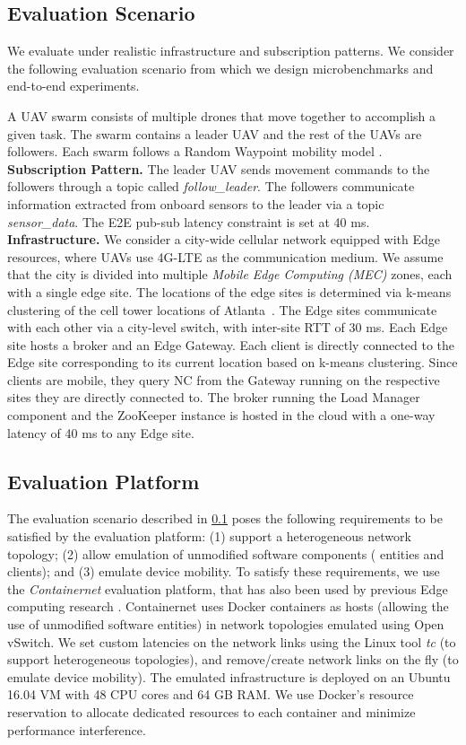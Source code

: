 \subsection{Evaluation Scenario}
\label{sec:epulsar_eval_scenario}
We evaluate \epulsar{} under realistic infrastructure and subscription patterns. We consider the following evaluation scenario from which we design microbenchmarks and end-to-end experiments.
\par A UAV swarm consists of multiple drones that move together to accomplish a given task. The swarm contains a leader UAV and the rest of the UAVs are followers. Each swarm follows a Random Waypoint mobility model \cite{rwp}.\\
\textbf{Subscription Pattern. } The leader UAV sends movement commands to the followers through a topic called \textit{follow\_leader}. The followers communicate information extracted from onboard sensors to the leader via a topic \textit{sensor\_data}. The E2E pub-sub latency constraint is set at 40 ms.\\
\textbf{Infrastructure. } We consider a city-wide cellular network equipped with Edge resources, where UAVs use 4G-LTE as the communication medium. We assume that the city is divided into multiple \textit{Mobile Edge Computing (MEC)} zones, each with a single edge site. The locations of the edge sites is determined via k-means clustering of the cell tower locations \cite{wang2019edge} of Atlanta~\cite{cellmapper}. The Edge sites communicate with each other via a city-level switch, with inter-site RTT of 30 ms. Each Edge site hosts a broker and an Edge Gateway. Each client is directly connected to the Edge site corresponding to its current location based on k-means clustering. Since clients are mobile, they query NC from the Gateway running on the respective sites they are directly connected to. The broker running the Load Manager component and the ZooKeeper instance is hosted in the cloud with a one-way latency of 40 ms to any Edge site.

\subsection{Evaluation Platform}
The evaluation scenario described in \cref{sec:epulsar_eval_scenario} poses the following requirements to be satisfied by the evaluation platform: (1) support a heterogeneous network topology; (2) allow emulation of unmodified software components (\epulsar{} entities and clients); and (3) emulate device mobility. To satisfy these requirements, we use the \textit{Containernet} \cite{containernet} evaluation platform, that has also been used by previous Edge computing research \cite{rothenberg2020intent,fiandrino2019openleon}. Containernet uses Docker containers as hosts (allowing the use of unmodified software entities) in network topologies emulated using Open vSwitch.
We set custom latencies on the network links using the Linux tool \emph{tc} (to support heterogeneous topologies), and remove/create network links on the fly (to emulate device mobility). 
The emulated infrastructure is deployed on an Ubuntu 16.04 VM with 48 CPU cores and 64 GB RAM. We use Docker's resource reservation to allocate dedicated resources to each container and minimize performance interference.

